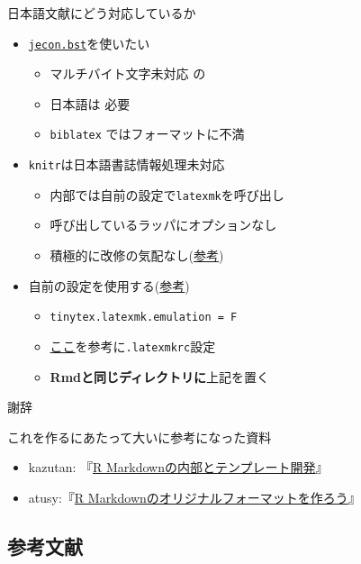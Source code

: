 \documentclass[
  12pt,
  ignorenonframetext,
]{beamer}
\newif\ifbibliography
\providecommand{\tightlist}{%
  \setlength{\itemsep}{0pt}\setlength{\parskip}{0pt}}
\begin{document}
\begin{frame}[fragile]{日本語文献にどう対応しているか}
\protect\hypertarget{ux65e5ux672cux8a9eux6587ux732eux306bux3069ux3046ux5bfeux5fdcux3057ux3066ux3044ux308bux304b}{}

\begin{itemize}
\tightlist
\item
  \href{https://github.com/ShiroTakeda/jecon-bst/blob/master/jecon.bst}{\texttt{jecon.bst}}を使いたい

  \begin{itemize}
  \tightlist
  \item
    マルチバイト文字未対応 の\BibTeX 
  \item
    日本語は \upBibTeX 必要
  \item
    \texttt{biblatex} ではフォーマットに不満
  \end{itemize}
\item
  \texttt{knitr}は日本語書誌情報処理未対応

  \begin{itemize}
  \tightlist
  \item
    内部では自前の設定で\texttt{latexmk}を呼び出し
  \item
    呼び出しているラッパにオプションなし
  \item
    積極的に改修の気配なし(\href{https://github.com/yihui/tinytex/issues/70}{参考})
  \end{itemize}
\item
  自前の設定を使用する(\href{https://github.com/kenjimyzk/bookdown_ja_template}{参考})

  \begin{itemize}
  \tightlist
  \item
    \texttt{tinytex.latexmk.emulation\ =\ F}
  \item
    \href{https://texwiki.texjp.org/?Latexmk}{ここ}を参考に\texttt{.latexmkrc}設定
  \item
    \textbf{Rmdと同じディレクトリに}上記を置く
  \end{itemize}
\end{itemize}

\end{frame}

\begin{frame}{謝辞}
\protect\hypertarget{ux8b1dux8f9e}{}

これを作るにあたって大いに参考になった資料

\begin{itemize}
\tightlist
\item
  kazutan:
  『\href{https://kazutan.github.io/HijiyamaR6/intoTheRmarkdown.html}{R
  Markdownの内部とテンプレート開発}』
\item
  atusy:『\href{https://atusy.github.io/tokyor85-original-rmd-format/\#/}{R
  Markdownのオリジナルフォーマットを作ろう}』
\end{itemize}

\end{frame}

\begin{frame}

\section*{参考文献}

\end{frame}

\begin{frame}[allowframebreaks]{}
  \bibliographytrue
  
\end{frame}
\end{document}
